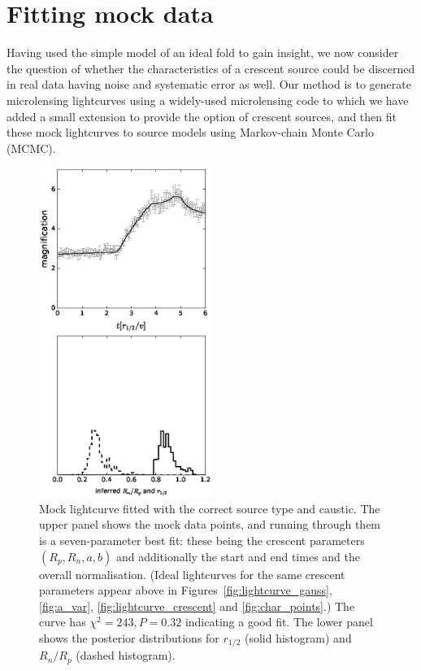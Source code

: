 \documentclass[usenatbib]{mn2e}
\begin{document}
\section{Fitting mock data}\label{sec:numerics}

Having used the simple model of an ideal fold to gain insight, we now
consider the question of whether the characteristics of a crescent
source could be discerned in real data having noise and systematic
error as well.  Our method is to generate microlensing lightcurves
using a widely-used microlensing code
\citep{1990PhDT.......180W,1999A&A...346L...5W,1999JCoAM.109..353W} to
which we have added a small extension to provide the option of
crescent sources, and then fit these mock lightcurves to source models
using Markov-chain Monte Carlo (MCMC).

\begin{figure}
\centering
  \includegraphics[width=0.5\textwidth]{figures/cc_forward.eps}
\caption{\label{fig:cc_forward} Mock lightcurve fitted with the
  correct source type and caustic.  The upper panel shows the mock
  data points, and running through them is a seven-parameter best fit:
  these being the crescent parameters $(R_p,R_n,a,b)$ and additionally
  the start and end times and the overall normalisation.  (Ideal
  lightcurves for the same crescent parameters appear above in
  Figures~\ref{fig:lightcurve_gauss}, \ref{fig:a_var},
  \ref{fig:lightcurve_crescent} and \ref{fig:char_points}.)  The curve
  has $\chi^2=243, P=0.32$ indicating a good fit.  The lower panel
  shows the posterior distributions for $r_{1/2}$ (solid histogram)
  and $R_n/R_p$ (dashed histogram).}
\end{figure}
\end{document}
